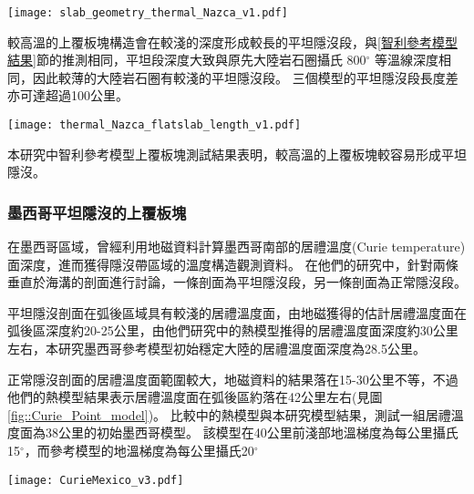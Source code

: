 \begin{figure*}[ht!]
    \centering
    \texttt{[image: slab\_geometry\_thermal\_Nazca\_v1.pdf]}
    \caption[不同上覆板塊厚度模型在40 Myr的隱沒板塊構造]{不同上覆板塊厚度模型在40 Myr時隱沒板塊於150公里以上之構造，幾何形狀取自隱沒板塊頂部，使用5公里移動平均平滑離散化的網格。}
    \label{fig::compare_geometry}
\end{figure*}

較高溫的上覆板塊構造會在較淺的深度形成較長的平坦隱沒段，與\ref{智利參考模型結果}節的推測相同，平坦段深度大致與原先大陸岩石圈攝氏 800$^\circ$ 等溫線深度相同，因此較薄的大陸岩石圈有較淺的平坦隱沒段。
三個模型的平坦隱沒段長度差亦可達超過100公里。

\begin{figure*}[h]
    \centering
    \texttt{[image: thermal\_Nazca\_flatslab\_length\_v1.pdf]}
    \caption[不同上覆板塊厚度模型的平坦段長度與深度]{不同上覆板塊厚度模型的平坦段(a)長度與(b)深度。}
    \label{fig::compare_slab_time}
\end{figure*}

本研究中智利參考模型上覆板塊測試結果表明，較高溫的上覆板塊較容易形成平坦隱沒。

\subsubsection{墨西哥平坦隱沒的上覆板塊}
在墨西哥區域，\citealp{Manea2011Curie}曾經利用地磁資料計算墨西哥南部的居禮溫度(Curie temperature)面深度，進而獲得隱沒帶區域的溫度構造觀測資料。
在他們的研究中，針對兩條垂直於海溝的剖面進行討論，一條剖面為平坦隱沒段，另一條剖面為正常隱沒段。

平坦隱沒剖面在弧後區域具有較淺的居禮溫度面，由地磁獲得的估計居禮溫度面在弧後區深度約20-25公里，由他們研究中的熱模型推得的居禮溫度面深度約30公里左右，本研究墨西哥參考模型初始穩定大陸的居禮溫度面深度為28.5公里。

正常隱沒剖面的居禮溫度面範圍較大，地磁資料的結果落在15-30公里不等，不過他們的熱模型結果表示居禮溫度面在弧後區約落在42公里左右(見圖\ref{fig::Curie_Point_model})。
比較\citealp{Manea2011Curie}中的熱模型與本研究模型結果，測試一組居禮溫度面為38公里的初始墨西哥模型。
該模型在40公里前淺部地溫梯度為每公里攝氏15$^\circ$，而參考模型的地溫梯度為每公里攝氏20$^\circ$

\begin{figure*}[h]
    \centering
    \texttt{[image: CurieMexico\_v3.pdf]}
    \caption[墨西哥兩條剖面的居禮溫度面與熱構造模型與不同地溫梯度的墨西哥模型在30 Myr的隱沒板塊構造與580$^\circ$等溫線]{(a)(b)(d)(e)墨西哥兩條剖面的居禮溫度面與熱構造模型，摘自\citealp{Manea2011Curie}。(c)(f)不同地溫梯度的墨西哥模型在30 Myr的隱沒板塊構造(黑線)於100公里以上之剖面與580$^\circ$等溫線(橘線)，幾何形狀取自隱沒板塊頂部，使用5公里移動平均平滑離散化的網格。}
    \label{fig::Curie_Point_model}
\end{figure*}

